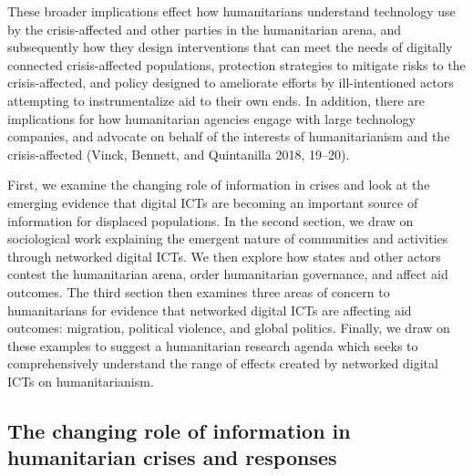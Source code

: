 \documentclass[
]{article}
\begin{document}
These broader implications effect how humanitarians understand
technology use by the crisis-affected and other parties in the
humanitarian arena, and subsequently how they design interventions that
can meet the needs of digitally connected crisis-affected populations,
protection strategies to mitigate risks to the crisis-affected, and
policy designed to ameliorate efforts by ill-intentioned actors
attempting to instrumentalize aid to their own ends. In addition, there
are implications for how humanitarian agencies engage with large
technology companies, and advocate on behalf of the interests of
humanitarianism and the crisis-affected (Vinck, Bennett, and Quintanilla
2018, 19--20).

First, we examine the changing role of information in crises and look at
the emerging evidence that digital ICTs are becoming an important source
of information for displaced populations. In the second section, we draw
on sociological work explaining the emergent nature of communities and
activities through networked digital ICTs. We then explore how states
and other actors contest the humanitarian arena, order humanitarian
governance, and affect aid outcomes. The third section then examines
three areas of concern to humanitarians for evidence that networked
digital ICTs are affecting aid outcomes: migration, political violence,
and global politics. Finally, we draw on these examples to suggest a
humanitarian research agenda which seeks to comprehensively understand
the range of effects created by networked digital ICTs on
humanitarianism.

\hypertarget{the-changing-role-of-information-in-humanitarian-crises-and-responses}{%
\subsection{The changing role of information in humanitarian crises and
responses}\label{the-changing-role-of-information-in-humanitarian-crises-and-responses}}
\end{document}
